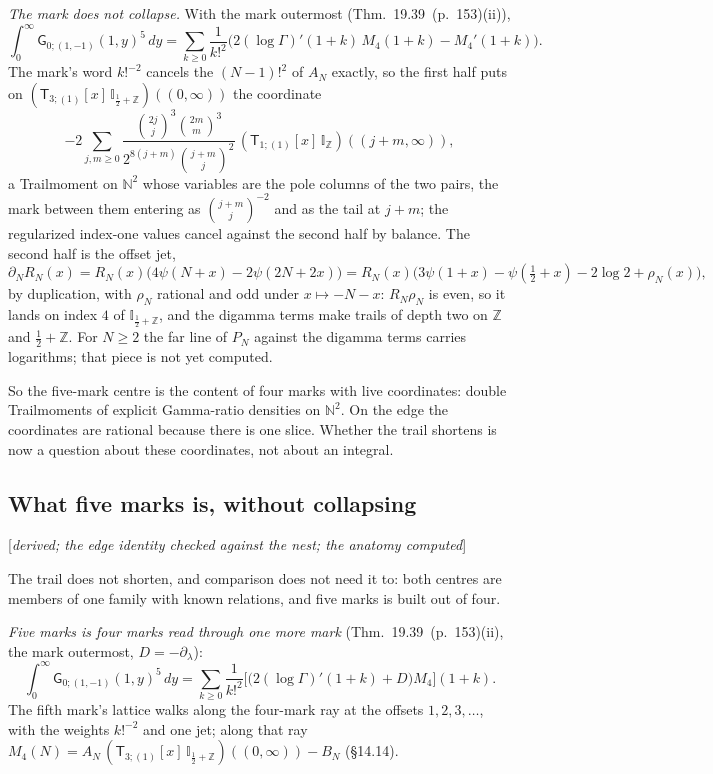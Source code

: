 \documentclass[11pt]{article}
\newcommand{\sG}{\mathsf G}
\newcommand{\sT}{\mathsf T}
\newcommand{\IZ}{\mathbb I_{\mathbb Z}}
\newcommand{\Ilat}[1]{\mathbb I_{#1}}
\newcommand{\Tx}[3]{(\sT_{#1;(1)}[x]\,#2)((#3,\infty))}
\newcommand{\status}[1]{\hfill{\small[\textit{#1}]}}
\newcommand{\hb}[2]{#1~(p.~#2)}   %
\theoremstyle{plain}
\theoremstyle{remark}
\begin{document}
\emph{The mark does not collapse.} With the mark outermost (Thm.~\hb{19.39}{153}(ii)),
\[
\int_0^\infty\sG_{0;(1,-1)}(1,y)^5\,dy=\sum_{k\ge0}\frac1{k!^2}\Big(2(\log\Gamma)'(1+k)\,M_4(1+k)-M_4'(1+k)\Big).
\]
The mark's word $k!^{-2}$ cancels the $(N-1)!^2$ of $A_N$ exactly, so the first half puts on $\Tx3{\Ilat{\frac12+\mathbb Z}}0$ the coordinate
\[
-2\sum_{j,m\ge0}\frac{\binom{2j}j^3\binom{2m}m^3}{2^{8(j+m)}\binom{j+m}j^2}\,\Tx1\IZ{j+m},
\]
a Trailmoment on $\mathbb N^2$ whose variables are the pole columns of the two pairs, the mark between them entering as $\binom{j+m}j^{-2}$ and as the tail at $j+m$; the regularized index-one values cancel against the second half by balance. The second half is the offset jet,
\[
\partial_NR_N(x)=R_N(x)\big(4\psi(N+x)-2\psi(2N+2x)\big)=R_N(x)\big(3\psi(1+x)-\psi(\tfrac12+x)-2\log2+\rho_N(x)\big),
\]
by duplication, with $\rho_N$ rational and odd under $x\mapsto-N-x$: $R_N\rho_N$ is even, so it lands on index $4$ of $\Ilat{\frac12+\mathbb Z}$, and the digamma terms make trails of depth two on $\mathbb Z$ and $\frac12+\mathbb Z$. For $N\ge2$ the far line of $P_N$ against the digamma terms carries logarithms; that piece is not yet computed.

So the five-mark centre is the content of four marks with live coordinates: double Trailmoments of explicit Gamma-ratio densities on $\mathbb N^2$. On the edge the coordinates are rational because there is one slice. Whether the trail shortens is now a question about these coordinates, not about an integral.

\subsection{What five marks is, without collapsing}\status{derived; the edge identity checked against the nest; the anatomy computed}

The trail does not shorten, and comparison does not need it to: both centres are members of one family with known relations, and five marks is built out of four.

\emph{Five marks is four marks read through one more mark} (Thm.~\hb{19.39}{153}(ii), the mark outermost, $D=-\partial_\lambda$):
\[
\int_0^\infty\sG_{0;(1,-1)}(1,y)^5\,dy=\sum_{k\ge0}\frac1{k!^2}\Big[\big(2(\log\Gamma)'(1+k)+D\big)M_4\Big](1+k).
\]
The fifth mark's lattice walks along the four-mark ray at the offsets $1,2,3,\dots$, with the weights $k!^{-2}$ and one jet; along that ray $M_4(N)=A_N\,\Tx3{\Ilat{\frac12+\mathbb Z}}0-B_N$ (\S14.14).
\end{document}
